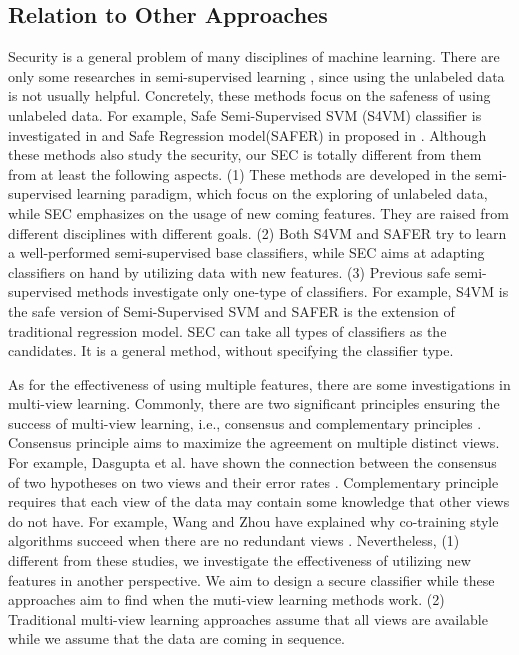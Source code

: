 \documentclass[10pt,journal,compsoc]{IEEEtran}
\begin{document}
\subsection{Relation to Other Approaches}

Security is a general problem of many disciplines of machine learning. There are only some researches in semi-supervised learning \cite{icml/LiZ11, pami/LiZ15, aaai/LiKZ16, aaai/LiZZ17}, since using the unlabeled data is not usually helpful. Concretely, these methods focus on the safeness of using unlabeled data. For example, Safe Semi-Supervised SVM (S4VM) classifier is investigated in \cite{pami/LiZ15} and Safe Regression model(SAFER) in proposed in \cite{aaai/LiZZ17}. Although these methods also study the security, our SEC is totally different from them from at least the following aspects. (1) These methods are developed in the semi-supervised learning paradigm, which focus on the exploring of unlabeled data, while SEC emphasizes on the usage of new coming features. They are raised from different disciplines with different goals. (2) Both S4VM and SAFER try to learn a well-performed semi-supervised base classifiers, while SEC aims at adapting classifiers on hand by utilizing data with new features. (3) Previous safe semi-supervised methods investigate only one-type of classifiers. For example, S4VM is the safe version of Semi-Supervised SVM and SAFER is the extension of traditional regression model. SEC can take all types of classifiers as the candidates. It is a general method, without specifying the classifier type.

As for the effectiveness of using multiple features, there are some investigations in multi-view learning. Commonly, there are two significant principles ensuring the success of multi-view learning, i.e., consensus and complementary principles \cite{xu2013MVLsurvey}. Consensus principle aims to maximize the agreement on multiple distinct views. For example, Dasgupta et al. have shown the connection between the consensus of two hypotheses on two views and their error rates \cite{DasguptaLM01}. Complementary principle requires that each view of the data may contain some knowledge that other views do not have. For example, Wang and Zhou have explained why co-training style algorithms succeed when there are no redundant views \cite{ecml/WangZ07}. Nevertheless, (1) different from these studies, we investigate the effectiveness of utilizing new features in another perspective. We aim to design a secure classifier while these approaches aim to find when the muti-view learning methods work. (2) Traditional multi-view learning approaches assume that all views are available while we assume that the data are coming in sequence.
\end{document}
